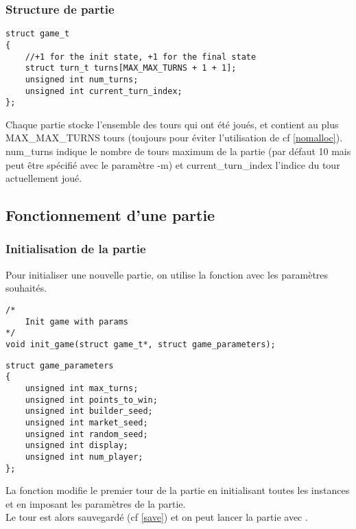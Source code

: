 \subsubsection*{Structure de partie}

\begin{lstlisting}[frame=single, caption={Implémentation de la structure game\_t}]
struct game_t
{
    //+1 for the init state, +1 for the final state
    struct turn_t turns[MAX_MAX_TURNS + 1 + 1]; 
    unsigned int num_turns;
    unsigned int current_turn_index;
};
\end{lstlisting}

Chaque partie stocke l'ensemble des tours qui ont été joués, et contient au plus\\ MAX\_MAX\_TURNS tours (toujours pour éviter l'utilisation de  cf \ref{nomalloc}).\\
num\_turns indique le nombre de tours maximum de la partie (par défaut 10 mais peut être spécifié avec le paramètre -m) et current\_turn\_index l'indice du tour actuellement joué.

\subsection{Fonctionnement d'une partie}

\subsubsection{Initialisation de la partie}
Pour initialiser une nouvelle partie, on utilise la fonction  avec les paramètres souhaités.
\lstset{language=C, style=code}
\begin{lstlisting}[frame=single]
/*
	Init game with params
*/
void init_game(struct game_t*, struct game_parameters);
\end{lstlisting}

\begin{lstlisting}[frame=single, caption={Structure des paramètres de la partie}]
struct game_parameters
{
	unsigned int max_turns;
	unsigned int points_to_win;
	unsigned int builder_seed;
	unsigned int market_seed;
	unsigned int random_seed;
	unsigned int display;
	unsigned int num_player;
};
\end{lstlisting}

La fonction  modifie le premier tour de la partie en initialisant toutes les instances et en imposant les paramètres de la partie.\\
Le tour est alors sauvegardé (cf \ref{save}) et on peut lancer la partie avec .

